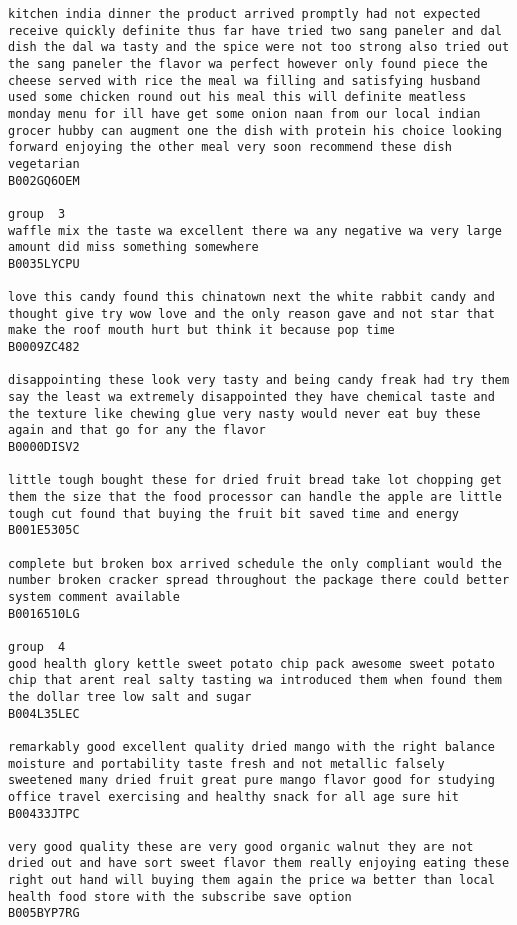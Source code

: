 \documentclass[11pt]{article}
\begin{document}
\begin{Verbatim}[commandchars=\\\{\}]
kitchen india dinner the product arrived promptly had not expected receive quickly definite thus far have tried two sang paneler and dal dish the dal wa tasty and the spice were not too strong also tried out the sang paneler the flavor wa perfect however only found piece the cheese served with rice the meal wa filling and satisfying husband used some chicken round out his meal this will definite meatless monday menu for ill have get some onion naan from our local indian grocer hubby can augment one the dish with protein his choice looking forward enjoying the other meal very soon recommend these dish vegetarian
B002GQ6OEM

group  3
waffle mix the taste wa excellent there wa any negative wa very large amount did miss something somewhere
B0035LYCPU

love this candy found this chinatown next the white rabbit candy and thought give try wow love and the only reason gave and not star that make the roof mouth hurt but think it because pop time
B0009ZC482

disappointing these look very tasty and being candy freak had try them say the least wa extremely disappointed they have chemical taste and the texture like chewing glue very nasty would never eat buy these again and that go for any the flavor
B0000DISV2

little tough bought these for dried fruit bread take lot chopping get them the size that the food processor can handle the apple are little tough cut found that buying the fruit bit saved time and energy
B001E5305C

complete but broken box arrived schedule the only compliant would the number broken cracker spread throughout the package there could better system comment available
B0016510LG

group  4
good health glory kettle sweet potato chip pack awesome sweet potato chip that arent real salty tasting wa introduced them when found them the dollar tree low salt and sugar
B004L35LEC

remarkably good excellent quality dried mango with the right balance moisture and portability taste fresh and not metallic falsely sweetened many dried fruit great pure mango flavor good for studying office travel exercising and healthy snack for all age sure hit
B00433JTPC

very good quality these are very good organic walnut they are not dried out and have sort sweet flavor them really enjoying eating these right out hand will buying them again the price wa better than local health food store with the subscribe save option
B005BYP7RG


\end{Verbatim}
\end{document}

